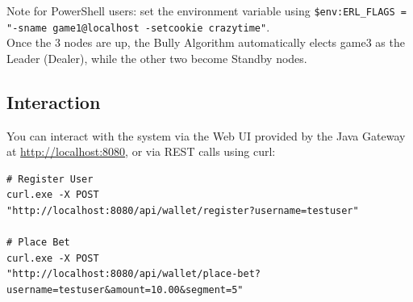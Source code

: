 \documentclass[12pt,a4paper]{article}
\begin{document}
Note for PowerShell users: set the environment variable using \texttt{\$env:ERL\_FLAGS = "-sname game1@localhost -setcookie crazytime"}.\\
Once the 3 nodes are up, the Bully Algorithm automatically elects game3 as the Leader (Dealer), while the other two become Standby nodes.

\subsection{Interaction}
You can interact with the system via the Web UI provided by the Java Gateway at \url{http://localhost:8080}, or via REST calls using curl:

\begin{verbatim}
# Register User
curl.exe -X POST 
"http://localhost:8080/api/wallet/register?username=testuser"

# Place Bet
curl.exe -X POST 
"http://localhost:8080/api/wallet/place-bet?username=testuser&amount=10.00&segment=5"
\end{verbatim}
\end{document}
